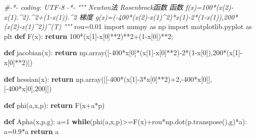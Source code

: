 \documentclass[]{article}
\newenvironment{Shaded}{}{}
\newcommand{\KeywordTok}[1]{\textcolor[rgb]{0.00,0.44,0.13}{\textbf{#1}}}
\newcommand{\DecValTok}[1]{\textcolor[rgb]{0.25,0.63,0.44}{#1}}
\newcommand{\FloatTok}[1]{\textcolor[rgb]{0.25,0.63,0.44}{#1}}
\newcommand{\ImportTok}[1]{#1}
\newcommand{\CommentTok}[1]{\textcolor[rgb]{0.38,0.63,0.69}{\textit{#1}}}
\newcommand{\ControlFlowTok}[1]{\textcolor[rgb]{0.00,0.44,0.13}{\textbf{#1}}}
\newcommand{\OperatorTok}[1]{\textcolor[rgb]{0.40,0.40,0.40}{#1}}
\newcommand{\NormalTok}[1]{#1}
\begin{document}
\begin{Shaded}
\begin{Highlighting}[]
\CommentTok{#-*- coding: UTF-8 -*-}
\CommentTok{"""}
\CommentTok{Newton法}
\CommentTok{Rosenbrock函数}
\CommentTok{函数 f(x)=100*(x(2)-x(1).^2).^2+(1-x(1)).^2}
\CommentTok{梯度 g(x)=(-400*(x(2)-x(1)^2)*x(1)-2*(1-x(1)),200*(x(2)-x(1)^2))^(T)}
\CommentTok{"""}
\NormalTok{rou}\OperatorTok{=}\FloatTok{0.01}
\ImportTok{import}\NormalTok{ numpy }\ImportTok{as}\NormalTok{ np}
\ImportTok{import}\NormalTok{ matplotlib.pyplot }\ImportTok{as}\NormalTok{ plt}
\KeywordTok{def}\NormalTok{ F(x):}
    \ControlFlowTok{return} \DecValTok{100}\OperatorTok{*}\NormalTok{(x[}\DecValTok{1}\NormalTok{]}\OperatorTok{-}\NormalTok{x[}\DecValTok{0}\NormalTok{]}\OperatorTok{**}\DecValTok{2}\NormalTok{)}\OperatorTok{**}\DecValTok{2}\OperatorTok{+}\NormalTok{(}\DecValTok{1}\OperatorTok{-}\NormalTok{x[}\DecValTok{0}\NormalTok{])}\OperatorTok{**}\DecValTok{2}\OperatorTok{;}

\KeywordTok{def}\NormalTok{ jacobian(x):}
    \ControlFlowTok{return}\NormalTok{ np.array([}\OperatorTok{-}\DecValTok{400}\OperatorTok{*}\NormalTok{x[}\DecValTok{0}\NormalTok{]}\OperatorTok{*}\NormalTok{(x[}\DecValTok{1}\NormalTok{]}\OperatorTok{-}\NormalTok{x[}\DecValTok{0}\NormalTok{]}\OperatorTok{**}\DecValTok{2}\NormalTok{)}\OperatorTok{-}\DecValTok{2}\OperatorTok{*}\NormalTok{(}\DecValTok{1}\OperatorTok{-}\NormalTok{x[}\DecValTok{0}\NormalTok{]),}\DecValTok{200}\OperatorTok{*}\NormalTok{(x[}\DecValTok{1}\NormalTok{]}\OperatorTok{-}\NormalTok{x[}\DecValTok{0}\NormalTok{]}\OperatorTok{**}\DecValTok{2}\NormalTok{)])}

\KeywordTok{def}\NormalTok{ hessian(x):}
    \ControlFlowTok{return}\NormalTok{ np.array([[}\OperatorTok{-}\DecValTok{400}\OperatorTok{*}\NormalTok{(x[}\DecValTok{1}\NormalTok{]}\OperatorTok{-}\DecValTok{3}\OperatorTok{*}\NormalTok{x[}\DecValTok{0}\NormalTok{]}\OperatorTok{**}\DecValTok{2}\NormalTok{)}\OperatorTok{+}\DecValTok{2}\NormalTok{,}\OperatorTok{-}\DecValTok{400}\OperatorTok{*}\NormalTok{x[}\DecValTok{0}\NormalTok{]],[}\OperatorTok{-}\DecValTok{400}\OperatorTok{*}\NormalTok{x[}\DecValTok{0}\NormalTok{],}\DecValTok{200}\NormalTok{]])}

\KeywordTok{def}\NormalTok{ phi(a,x,p):}
    \ControlFlowTok{return}\NormalTok{ F(x}\OperatorTok{+}\NormalTok{a}\OperatorTok{*}\NormalTok{p)}


\KeywordTok{def}\NormalTok{ Apha(x,p,g):}
\NormalTok{    a}\OperatorTok{=}\DecValTok{1}
    \ControlFlowTok{while}\NormalTok{(phi(a,x,p)}\OperatorTok{>=}\NormalTok{F(x)}\OperatorTok{+}\NormalTok{rou}\OperatorTok{*}\NormalTok{np.dot(p.transpose(),g)}\OperatorTok{*}\NormalTok{a):}
\NormalTok{        a}\OperatorTok{=}\FloatTok{0.9}\OperatorTok{*}\NormalTok{a}
    \ControlFlowTok{return}\NormalTok{ a}


\end{Highlighting}
\end{Shaded}
\end{document}

